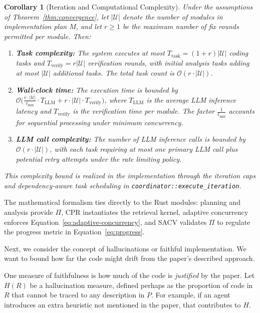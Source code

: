 \documentclass{ieeeaccess}
\newtheorem{corollary}{Corollary}
\begin{document}
\begin{corollary}[Iteration and Computational Complexity]
\label{cor:complexity}
Under the assumptions of Theorem~\ref{thm:convergence}, let \(|\mathcal{U}|\) denote the number of modules in implementation plan \(M\), and let \(r \geq 1\) be the maximum number of fix rounds permitted per module. Then:
\begin{enumerate}
\item \textbf{Task complexity:} The system executes at most \(T_{\text{task}} = (1 + r)|\mathcal{U}|\) coding tasks and \(T_{\text{verify}} = r|\mathcal{U}|\) verification rounds, with initial analysis tasks adding at most \(|\mathcal{U}|\) additional tasks. The total task count is \(\mathcal{O}(r \cdot |\mathcal{U}|)\).
\item \textbf{Wall-clock time:} The execution time is bounded by \(\mathcal{O}\bigl(\frac{r \cdot |\mathcal{U}|}{\ell_{\min}} \cdot T_{\text{LLM}} + r \cdot |\mathcal{U}| \cdot T_{\text{verify}}\bigr)\), where \(T_{\text{LLM}}\) is the average LLM inference latency and \(T_{\text{verify}}\) is the verification time per module. The factor \(\frac{1}{\ell_{\min}}\) accounts for sequential processing under minimum concurrency.
\item \textbf{LLM call complexity:} The number of LLM inference calls is bounded by \(\mathcal{O}(r \cdot |\mathcal{U}|)\), with each task requiring at most one primary LLM call plus potential retry attempts under the rate limiting policy.
\end{enumerate}
This complexity bound is realized in the implementation through the iteration caps and dependency-aware task scheduling in \texttt{coordinator::execute\_iteration}.
\end{corollary}

The mathematical formalism ties directly to the Rust modules: planning and analysis provide \(\Pi\), CPR instantiates the retrieval kernel, adaptive concurrency enforces Equation~\eqref{eq:adaptive-concurrency}, and SACV validates \(\Pi\) to regulate the progress metric in Equation~\eqref{eq:progress}.

Next, we consider the concept of hallucinations or faithful implementation. We want to bound how far the code might drift from the paper's described approach.

One measure of faithfulness is how much of the code is \emph{justified} by the paper. Let $H(R)$ be a hallucination measure, defined perhaps as the proportion of code in $R$ that cannot be traced to any description in $P$. For example, if an agent introduces an extra heuristic not mentioned in the paper, that contributes to $H$.
\end{document}
